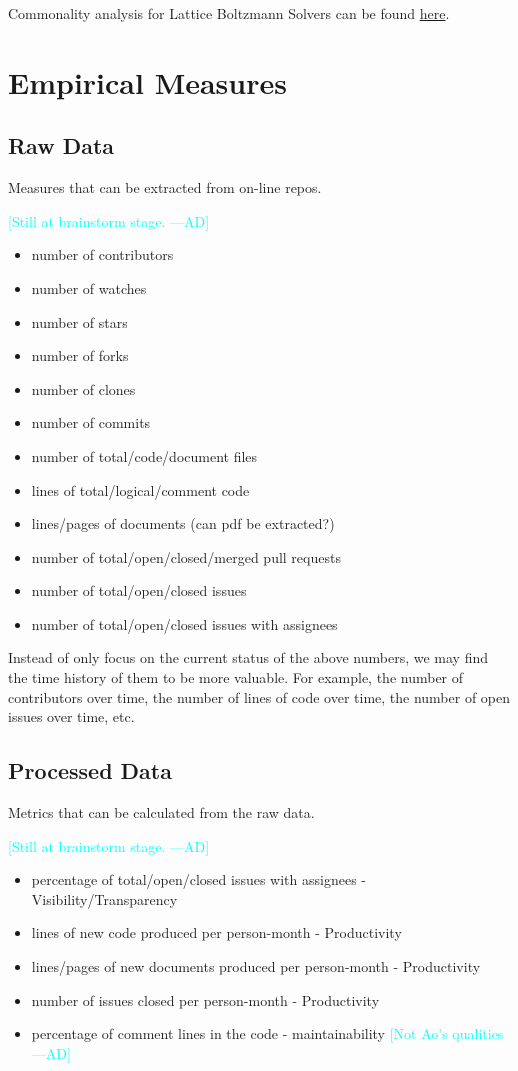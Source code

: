 \documentclass[letterpaper,cleveref]{lipics-v2019}
\newcommand{\authornote}[3]{\textcolor{#1}{[#3 ---#2]}}
\newcommand{\authornote}[3]{}
\newcommand{\ad}[1]{\authornote{cyan}{AD}{#1}} %
\theoremstyle{definition}
\begin{document}
Commonality analysis for Lattice Boltzmann Solvers can be found \href{run:../Peter-Notes/Commonality-Analysis-LB-Systems.pdf}{here}.

\section{Empirical Measures}

\subsection{Raw Data}
Measures that can be extracted from on-line repos.

\ad{Still at brainstorm stage.}
\begin{itemize}
\item number of contributors
\item number of watches
\item number of stars
\item number of forks
\item number of clones
\item number of commits
\item number of total/code/document files
\item lines of total/logical/comment code
\item lines/pages of documents (can pdf be extracted?)
\item number of total/open/closed/merged pull requests
\item number of total/open/closed issues
\item number of total/open/closed issues with assignees
\end{itemize}

Instead of only focus on the current status of the above numbers, we may find
the time history of them to be more valuable. For example, the number of
contributors over time, the number of lines of code over time, the number of
open issues over time, etc.

\subsection{Processed Data}
Metrics that can be calculated from the raw data.

\ad{Still at brainstorm stage.}
\begin{itemize}
\item percentage of total/open/closed issues with assignees -
Visibility/Transparency
\item lines of new code produced per person-month - Productivity
\item lines/pages of new documents produced per person-month - Productivity
\item number of issues closed per person-month - Productivity
\item percentage of comment lines in the code - maintainability \ad{Not Ao's
qualities}
\end{itemize}
\end{document}
